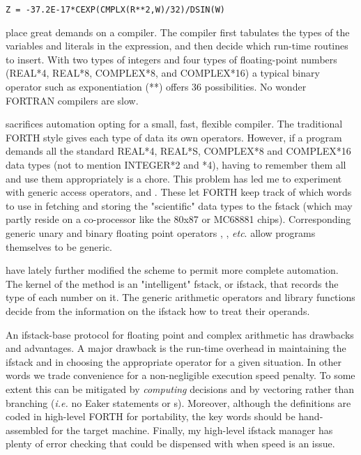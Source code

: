 \begin{lstlisting}
Z = -37.2E-17*CEXP(CMPLX(R**2,W)/32)/DSIN(W)
\end{lstlisting}

place great demands on a compiler. The compiler first tabulates the types of the variables and literals in the expression, and then decide which run-time routines to insert. With two types of integers and four types of floating-point numbers (REAL*4, REAL*8, COMPLEX*8, and COMPLEX*16) a typical binary operator such as exponentiation (**) offers 36 possibilities. No wonder FORTRAN compilers are slow. 

 sacrifices automation opting for a small, fast, flexible compiler. The traditional FORTH style gives each type of data its own operators. However, if a program demands all the standard REAL*4, REAL*S, COMPLEX*8 and COMPLEX*16 data types (not to mention INTEGER*2 and *4), having to remember them all and use them appropriately is a chore. This problem has led me to experiment with generic access operators,  and . These let FORTH keep track of which words to use in fetching and storing the "scientific" data types to the fstack (which may partly reside on a co-processor like the 80x87 or MC68881 chips). Corresponding generic unary and binary floating point operators , , \textit{etc}. allow programs themselves to be generic.

have lately further modified the scheme to permit more complete automation. The kernel of the method is an "intelligent" fstack, or ifstack, that records the type of each number on it. The generic arithmetic operators and library functions decide from the information on the ifstack how to treat their operands.

An ifstack-base protocol for floating point and complex arithmetic has drawbacks and advantages. A major drawback is the run-time overhead in maintaining the ifstack and in choosing the appropriate operator for a given situation. In other words we trade convenience for a non-negligible execution speed penalty. To some extent this can be mitigated by \textit{computing} decisions and by vectoring rather than branching (\textit{i.e.} no Eaker  statements or s). Moreover, although the definitions are coded in high-level FORTH for portability, the key words should be hand-assembled for the target machine. Finally, my high-level ifstack manager has plenty of error checking that could be dispensed with when speed is an issue.

